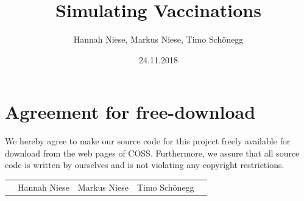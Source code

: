 \documentclass[11pt]{article}
\title{Simulating Vaccinations}
\author{Hannah Niese, Markus Niese, Timo Schönegg}
\date{24.11.2018}
\begin{document}

\newpage


\newpage
\section*{Agreement for free-download}
\bigskip


\bigskip


\large We hereby agree to make our source code for this project freely available for download from the web pages of COSS. Furthermore, we assure that all source code is written by ourselves and is not violating any copyright restrictions.

\begin{center}

\bigskip


\bigskip


\begin{tabular}{@{}p{0.5cm}@{}p{6cm}@{}p{6cm}@{}p{6cm}@{}p{1cm}}
\begin{minipage}{1cm}

\end{minipage}
&
\begin{minipage}{5cm}
\vspace{2mm} \large Hannah Niese

 \vspace{\baselineskip}

\end{minipage}
&
\begin{minipage}{5cm}

\large Markus Niese

\end{minipage}
&
\begin{minipage}{5cm}

\large Timo Schönegg

\end{minipage}
&
\begin{minipage}{1cm}

\end{minipage}

\end{tabular}


\end{center}
\newpage




\end{document}
